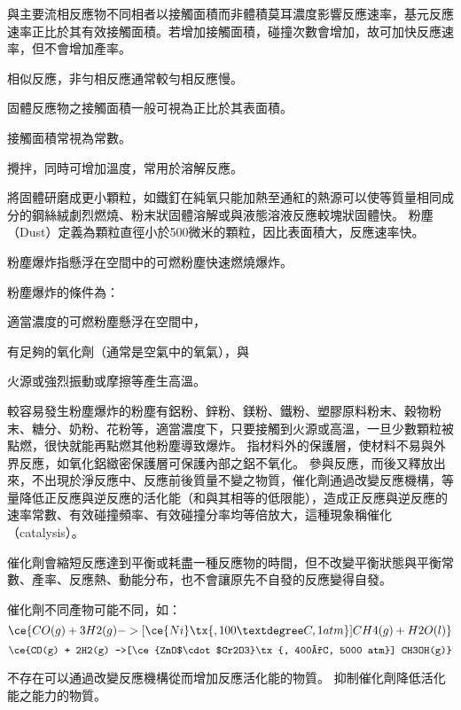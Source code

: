 \documentclass[a4paper,12pt]{report}
\begin{document}
與主要流相反應物不同相者以接觸面積而非體積莫耳濃度影響反應速率，基元反應速率正比於其有效接觸面積。若增加接觸面積，碰撞次數會增加，故可加快反應速率，但不會增加產率。

相似反應，非勻相反應通常較勻相反應慢。

固體反應物之接觸面積一般可視為正比於其表面積。

接觸面積常視為常數。
\bit
\item 攪拌，同時可增加溫度，常用於溶解反應。
\item 將固體研磨成更小顆粒，如鐵釘在純氧只能加熱至通紅的熱源可以使等質量相同成分的鋼絲絨劇烈燃燒、粉末狀固體溶解或與液態溶液反應較塊狀固體快。
\eit
{}
粉塵（Dust）定義為顆粒直徑小於500微米的顆粒，因比表面積大，反應速率快。

粉塵爆炸指懸浮在空間中的可燃粉塵快速燃燒爆炸。

粉塵爆炸的條件為：
\bit
\item 適當濃度的可燃粉塵懸浮在空間中，
\item 有足夠的氧化劑（通常是空氣中的氧氣），與
\item 火源或強烈振動或摩擦等產生高溫。
\eit

較容易發生粉塵爆炸的粉塵有鋁粉、鋅粉、鎂粉、鐵粉、塑膠原料粉末、穀物粉末、糖分、奶粉、花粉等，適當濃度下，只要接觸到火源或高溫，一旦少數顆粒被點燃，很快就能再點燃其他粉塵導致爆炸。
指材料外的保護層，使材料不易與外界反應，如氧化鋁緻密保護層可保護內部之鋁不氧化。
參與反應，而後又釋放出來，不出現於淨反應中、反應前後質量不變之物質，催化劑通過改變反應機構，等量降低正反應與逆反應的活化能（和與其相等的低限能），造成正反應與逆反應的速率常數、有效碰撞頻率、有效碰撞分率均等倍放大，這種現象稱催化（catalysis）。

催化劑會縮短反應達到平衡或耗盡一種反應物的時間，但不改變平衡狀態與平衡常數、產率、反應熱、動能分布，也不會讓原先不自發的反應變得自發。

催化劑不同產物可能不同，如：
\[\ce{CO(g) + 3H2(g) ->[\ce{Ni}\tx{, 100°C, 1 atm}] CH4(g) + H2O(l)}\]
\[\ce{CO(g) + 2H2(g) ->[\ce{ZnO$\cdot$Cr2O3}\tx{, 400°C, 5000 atm}] CH3OH(g)}\]

不存在可以通過改變反應機構從而增加反應活化能的物質。
抑制催化劑降低活化能之能力的物質。
\end{document}
